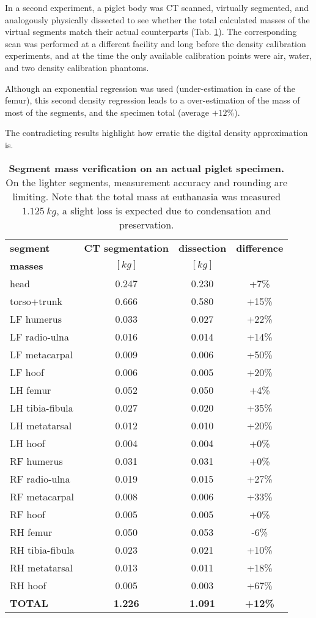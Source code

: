 In a second experiment, a piglet body was CT scanned, virtually segmented, and analogously physically dissected to see whether the total calculated masses of the virtual segments match their actual counterparts (Tab. \ref{tab:pigletdissection}).
The corresponding scan was performed at a different facility and long before the density calibration experiments, and at the time the only available calibration points were air, water, and two density calibration phantoms.

Although an exponential regression was used (under-estimation in case of the femur), this second density regression leads to a over-estimation of the mass of most of the segments, and the specimen total (average \(+12 \%\)).

The contradicting results highlight how erratic the digital density approximation is.



\begin{table}[p]
\caption{\label{tab:pigletdissection}\textbf{Segment mass verification on an actual piglet specimen.} On the lighter segments, measurement accuracy and rounding are limiting. Note that the total mass at euthanasia was measured \(1.125\ kg\), a slight loss is expected due to condensation and preservation.}
\centering
\begin{tabular}{|l|c|c|c|}
\hline
\textbf{segment} & \textbf{CT segmentation} & \textbf{dissection} & \textbf{difference}\\[0pt]
\textbf{masses} & \([kg]\) & \([kg]\) & \\[0pt]
\hline
\hline
head & 0.247 & 0.230 & +7\%\\[0pt]
torso+trunk & 0.666 & 0.580 & +15\%\\[0pt]
LF humerus & 0.033 & 0.027 & +22\%\\[0pt]
LF radio-ulna & 0.016 & 0.014 & +14\%\\[0pt]
LF metacarpal & 0.009 & 0.006 & +50\%\\[0pt]
LF hoof & 0.006 & 0.005 & +20\%\\[0pt]
LH femur & 0.052 & 0.050 & +4\%\\[0pt]
LH tibia-fibula & 0.027 & 0.020 & +35\%\\[0pt]
LH metatarsal & 0.012 & 0.010 & +20\%\\[0pt]
LH hoof & 0.004 & 0.004 & +0\%\\[0pt]
RF humerus & 0.031 & 0.031 & +0\%\\[0pt]
RF radio-ulna & 0.019 & 0.015 & +27\%\\[0pt]
RF metacarpal & 0.008 & 0.006 & +33\%\\[0pt]
RF hoof & 0.005 & 0.005 & +0\%\\[0pt]
RH femur & 0.050 & 0.053 & -6\%\\[0pt]
RH tibia-fibula & 0.023 & 0.021 & +10\%\\[0pt]
RH metatarsal & 0.013 & 0.011 & +18\%\\[0pt]
RH hoof & 0.005 & 0.003 & +67\%\\[0pt]
\hline
\textbf{TOTAL} & \textbf{1.226} & \textbf{1.091} & \textbf{+12\%}\\[0pt]
\hline
\hline
\end{tabular}
\end{table}
